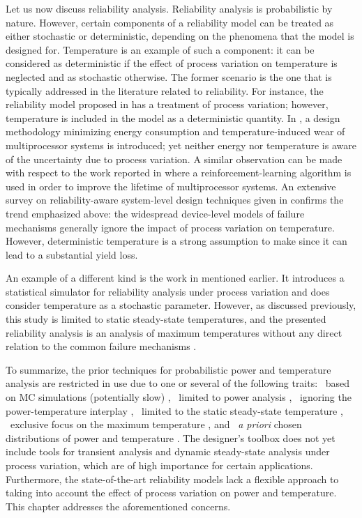 Let us now discuss reliability analysis. Reliability analysis is probabilistic
by nature. However, certain components of a reliability model can be treated as
either stochastic or deterministic, depending on the phenomena that the model is
designed for. Temperature is an example of such a component: it can be
considered as deterministic if the effect of process variation on temperature is
neglected and as stochastic otherwise. The former scenario is the one that is
typically addressed in the literature related to reliability. For instance, the
reliability model proposed in \cite{xiang2010} has a treatment of process
variation; however, temperature is included in the model as a deterministic
quantity. In \cite{das2014a}, a design methodology minimizing energy consumption
and temperature-induced wear of multiprocessor systems is introduced; yet
neither energy nor temperature is aware of the uncertainty due to process
variation. A similar observation can be made with respect to the work reported
in \cite{das2014c} where a reinforcement-learning algorithm is used in order to
improve the lifetime of multiprocessor systems. An extensive survey on
reliability-aware system-level design techniques given in \cite{das2014b}
confirms the trend emphasized above: the widespread device-level models of
failure mechanisms generally ignore the impact of process variation on
temperature. However, deterministic temperature is a strong assumption to make
since it can lead to a substantial yield loss.

An example of a different kind is the work in \cite{lee2013} mentioned earlier.
It introduces a statistical simulator for reliability analysis under process
variation and does consider temperature as a stochastic parameter. However, as
discussed previously, this study is limited to static steady-state temperatures,
and the presented reliability analysis is an analysis of maximum temperatures
without any direct relation to the common failure mechanisms \cite{jedec2016}.

To summarize, the prior techniques for probabilistic power and temperature
analysis are restricted in use due to one or several of the following traits:
\one~based on \ac{MC} simulations (potentially slow) \cite{chandra2010},
\two~limited to power analysis \cite{bhardwaj2006, ghanta2006, vrudhula2006,
bhardwaj2008, shen2009, chandra2010}, \three~ignoring the power-temperature
interplay \cite{bhardwaj2006, ghanta2006, vrudhula2006, bhardwaj2008,
huang2009a, shen2009}, \four~limited to the static steady-state temperature
\cite{huang2009a, juan2011, juan2012, lee2013}, \five~exclusive focus on the
maximum temperature \cite{juan2011}, and \six~\emph{a priori} chosen
distributions of power and temperature \cite{bhardwaj2006, srivastava2010,
juan2012}. The designer's toolbox does not yet include tools for transient
analysis and dynamic steady-state analysis under process variation, which are of
high importance for certain applications. Furthermore, the state-of-the-art
reliability models lack a flexible approach to taking into account the effect of
process variation on power and temperature. This chapter addresses the
aforementioned concerns.
